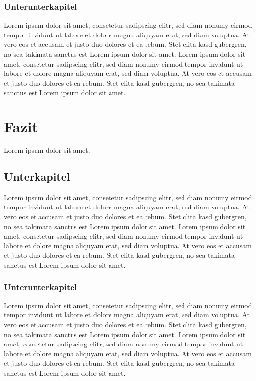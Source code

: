 \documentclass{article}
\begin{document}
\subsection{Unterunterkapitel}
\label{subsec:uu2}
Lorem ipsum dolor sit amet, consetetur sadipscing elitr, sed diam nonumy eirmod tempor invidunt ut labore et dolore magna aliquyam erat, sed diam voluptua. At vero eos et accusam et justo duo dolores et ea rebum. Stet clita kasd gubergren, no sea takimata sanctus est Lorem ipsum dolor sit amet. Lorem ipsum dolor sit amet, consetetur sadipscing elitr, sed diam nonumy eirmod tempor invidunt ut labore et dolore magna aliquyam erat, sed diam voluptua. At vero eos et accusam et justo duo dolores et ea rebum. Stet clita kasd gubergren, no sea takimata sanctus est Lorem ipsum dolor sit amet.


\chapter{Fazit}
\label{chap:fazit}
Lorem ipsum dolor sit amet.

\section{Unterkapitel}
\label{sec:u5}
Lorem ipsum dolor sit amet, consetetur sadipscing elitr, sed diam nonumy eirmod tempor invidunt ut labore et dolore magna aliquyam erat, sed diam voluptua. At vero eos et accusam et justo duo dolores et ea rebum. Stet clita kasd gubergren, no sea takimata sanctus est Lorem ipsum dolor sit amet. Lorem ipsum dolor sit amet, consetetur sadipscing elitr, sed diam nonumy eirmod tempor invidunt ut labore et dolore magna aliquyam erat, sed diam voluptua. At vero eos et accusam et justo duo dolores et ea rebum. Stet clita kasd gubergren, no sea takimata sanctus est Lorem ipsum dolor sit amet.

\subsection{Unterunterkapitel}
\label{sec:uu3}
Lorem ipsum dolor sit amet, consetetur sadipscing elitr, sed diam nonumy eirmod tempor invidunt ut labore et dolore magna aliquyam erat, sed diam voluptua. At vero eos et accusam et justo duo dolores et ea rebum. Stet clita kasd gubergren, no sea takimata sanctus est Lorem ipsum dolor sit amet. Lorem ipsum dolor sit amet, consetetur sadipscing elitr, sed diam nonumy eirmod tempor invidunt ut labore et dolore magna aliquyam erat, sed diam voluptua. At vero eos et accusam et justo duo dolores et ea rebum. Stet clita kasd gubergren, no sea takimata sanctus est Lorem ipsum dolor sit amet.
\end{document}
